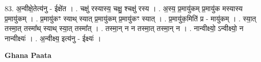 \documentclass[17pt]{extarticle}
\begin{document}
83. अ॒न्वीक्षे॒तेत्य॑नु - ईक्षे॑त । . चक्षु॑ रस्यास्य॒ चक्षु॒ श्चक्षु॑ रस्य । . अ॒स्य॒ प्र॒मायु॑कम् प्र॒मायु॑क मस्यास्य प्र॒मायु॑कम् । . प्र॒मायु॑कꣳ स्याथ् स्यात् प्र॒मायु॑कम् प्र॒मायु॑कꣳ स्यात् । . प्र॒मायु॑क॒मिति॑ प्र - मायु॑कम् । . स्या॒त् तस्मा॒त् तस्मा᳚थ् स्याथ् स्या॒त् तस्मा᳚त् । . तस्मा॒न् न न तस्मा॒त् तस्मा॒न् न । . नान्वीक्ष्यो॒ ऽन्वीक्ष्यो॒ न नान्वीक्ष्यः॑ । . अ॒न्वीक्ष्य॒ इत्य॑नु - ईक्ष्यः॑ । \newline

\textbf{Ghana Paata } \newline
\end{document}
